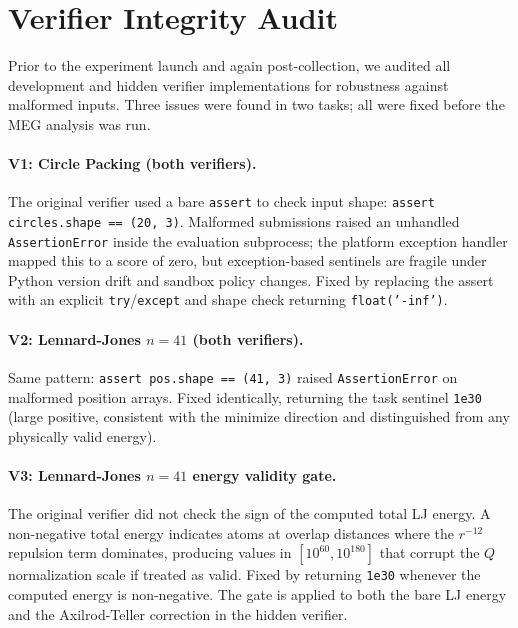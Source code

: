 \documentclass{article}
\begin{document}
\appendix

\section{Verifier Integrity Audit}
\label{app:verifier-audit}

Prior to the experiment launch and again post-collection, we audited all development and hidden verifier implementations for robustness against malformed inputs. Three issues were found in two tasks; all were fixed before the MEG analysis was run.

\paragraph{V1: Circle Packing (both verifiers).}
The original verifier used a bare \texttt{assert} to check input shape: \texttt{assert circles.shape == (20,\,3)}. Malformed submissions raised an unhandled \texttt{AssertionError} inside the evaluation subprocess; the platform exception handler mapped this to a score of zero, but exception-based sentinels are fragile under Python version drift and sandbox policy changes. Fixed by replacing the assert with an explicit \texttt{try}/\texttt{except} and shape check returning \texttt{float('-inf')}.

\paragraph{V2: Lennard-Jones $n=41$ (both verifiers).}
Same pattern: \texttt{assert pos.shape == (41,\,3)} raised \texttt{AssertionError} on malformed position arrays. Fixed identically, returning the task sentinel \texttt{1e30} (large positive, consistent with the minimize direction and distinguished from any physically valid energy).

\paragraph{V3: Lennard-Jones $n=41$ energy validity gate.}
The original verifier did not check the sign of the computed total LJ energy. A non-negative total energy indicates atoms at overlap distances where the $r^{-12}$ repulsion term dominates, producing values in $[10^{60}, 10^{180}]$ that corrupt the $Q$ normalization scale if treated as valid. Fixed by returning \texttt{1e30} whenever the computed energy is non-negative. The gate is applied to both the bare LJ energy and the Axilrod-Teller correction in the hidden verifier.
\end{document}
